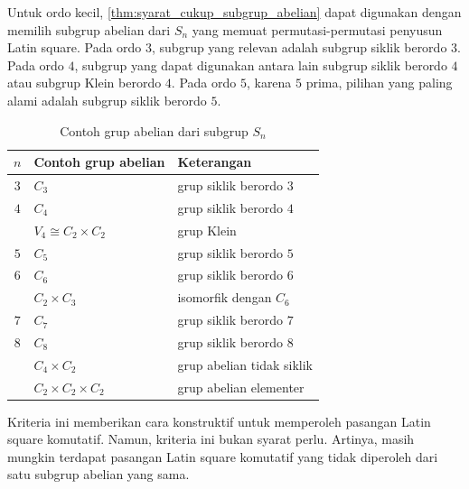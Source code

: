 Untuk ordo kecil, \autoref{thm:syarat_cukup_subgrup_abelian} dapat
digunakan dengan memilih subgrup abelian dari $S_n$ yang memuat
permutasi-permutasi penyusun Latin square. Pada ordo $3$, subgrup yang
relevan adalah subgrup siklik berordo $3$. Pada ordo $4$, subgrup yang
dapat digunakan antara lain subgrup siklik berordo $4$ atau subgrup Klein
berordo $4$. Pada ordo $5$, karena $5$ prima, pilihan yang paling alami
adalah subgrup siklik berordo $5$.

\begin{table}[H]
  \centering
  \label{tab:contoh_subgrup_abelian_sn}
  \begin{tabular}{|c|l|l|}
    \hline
    $n$ & Contoh grup abelian       & Keterangan                \\
    \hline
    $3$ & $C_3$                     & grup siklik berordo $3$   \\
    \hline
    $4$ & $C_4$                     & grup siklik berordo $4$   \\
        & $V_4\cong C_2\times C_2$  & grup Klein                \\
    \hline
    $5$ & $C_5$                     & grup siklik berordo $5$   \\
    \hline
    $6$ & $C_6$                     & grup siklik berordo $6$   \\
        & $C_2\times C_3$           & isomorfik dengan $C_6$    \\
    \hline
    $7$ & $C_7$                     & grup siklik berordo $7$   \\
    \hline
    $8$ & $C_8$                     & grup siklik berordo $8$   \\
        & $C_4\times C_2$           & grup abelian tidak siklik \\
        & $C_2\times C_2\times C_2$ & grup abelian elementer    \\
    \hline
  \end{tabular}
  \caption{Contoh grup abelian dari subgrup $S_n$}
\end{table}

Kriteria ini memberikan cara konstruktif untuk memperoleh pasangan Latin
square komutatif. Namun, kriteria ini bukan syarat perlu. Artinya, masih
mungkin terdapat pasangan Latin square komutatif yang tidak diperoleh dari
satu subgrup abelian yang sama.

